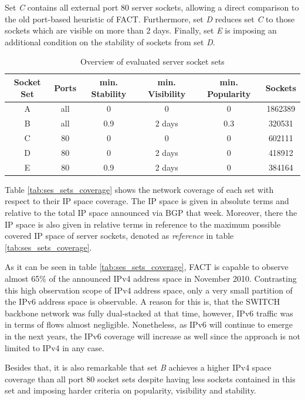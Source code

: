 Set \emph{C} contains all external port 80 \glspl{server socket}, allowing a direct comparison to the old port-based heuristic of \gls{FACT}. 
Furthermore, set \emph{D} reduces set \emph{C} to those sockets which are visible on more than 2 days. 
Finally, set \emph{E} is imposing an additional condition on the stability of sockets from set \emph{D}. 
\begin{table}
	[ht] \centering 
	\begin{tabular}
		{|c|c|c|c|c|c|} \hline \textbf{Socket Set} & \textbf{Ports} & \textbf{min. Stability} & \textbf{min. Visibility} & \textbf{min. Popularity} & \textbf{Sockets} \\
		\hline \hline A & all & 0 & 0 & 0 & 1862389 \\
		\hline B & all & 0.9 & 2 days & 0.3 & 320531 \\
		\hline C & 80 & 0 & 0 & 0 & 602111 \\
		\hline D & 80 & 0 & 2 days & 0 & 418912 \\
		\hline E & 80 & 0.9 & 2 days & 0 & 384164\\
		\hline 
	\end{tabular}
	\caption{Overview of evaluated \gls{server socket} sets} 
	\label{tab:ses_sets} 
\end{table}

Table \ref{tab:ses_sets_coverage} shows the network coverage of each set with respect to their IP space coverage. The IP space is given in absolute terms and relative to the total IP space announced via BGP that week. Moreover, there the IP space is also given in relative terms in reference to the maximum possible covered IP space of server sockets, denoted as \emph{reference} in table  \ref{tab:ses_sets_coverage}.

As it can be seen in table \ref{tab:ses_sets_coverage}, \gls{FACT} is capable to observe almost 65\% of the announced IPv4 address space in November 2010. 
Contrasting this high observation scope of IPv4 address space, only a very small partition of the IPv6 address space is observable. 
A reason for this is, that the SWITCH backbone network was fully dual-stacked at that time, however, IPv6 traffic was in terms of flows almost negligible. Nonetheless, as IPv6 will continue to emerge in the next years, the IPv6 coverage will increase as well since the approach is not limited to IPv4 in any case. 

Besides that, it is also remarkable that set \emph{B} achieves a higher \gls{IPv4} space coverage than all port 80 socket sets despite having less sockets contained in this set and imposing harder criteria on popularity, visibility and stability. 

